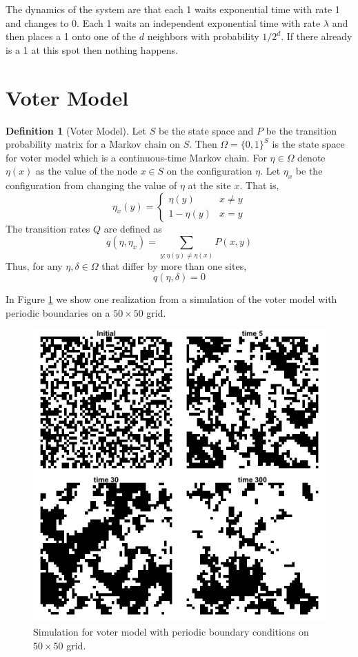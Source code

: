 \documentclass{article}
\theoremstyle{plain}
\theoremstyle{definition}
\newtheorem{defn}[theorem]{Definition}
\theoremstyle{remark}
\numberwithin{equation}{section}
\begin{document}
The dynamics of the system are that each 1 waits exponential time with rate 1 and changes to 0.
Each 1 waits an independent exponential time with rate $\lambda$ and then places a 1 onto one of the $d$ neighbors with probability $1/2^d$.
If there already is a 1 at this spot then nothing happens.
\cite{steif91}

\section{Voter Model}

\begin{defn}[Voter Model] \cite{Liggett2002}
Let $S$ be the state space and $P$ be the transition probability matrix for a Markov chain on $S$.
Then $\Omega = \{0,1\}^S$ is the state space for voter model which is a continuous-time Markov chain.
For $\eta \in \Omega$ denote $\eta(x)$ as the value of the node $x \in S$ on the configuration $\eta$.
Let $\eta_x$ be the configuration from changing the value of $\eta$ at the site $x$. That is,
$$
\eta_x(y) = \begin{cases}
    \eta(y) & x \not = y\\
    1 - \eta(y) & x = y
\end{cases}
$$
The transition rates $Q$ are defined as
$$
q(\eta, \eta_x) = \sum_{y : \eta(y) \not = \eta(x)} P(x,y)
$$
Thus, for any $\eta, \delta \in \Omega$ that differ by more than one sites,
$$
q(\eta, \delta) = 0
$$
\end{defn}

In Figure \ref{fig:voter_sim_torus.png} we show one realization from a simulation of the voter model with periodic boundaries on a $50 \times 50$ grid.

\begin{figure}[H]
  \centering
    \includegraphics[width=.80\textwidth]{figures/voter_simulation_torus_50.png}
   \caption{Simulation for voter model with periodic boundary conditions on $50 \times 50$ grid.}
  \label{fig:voter_sim_torus.png}
\end{figure}
\end{document}
